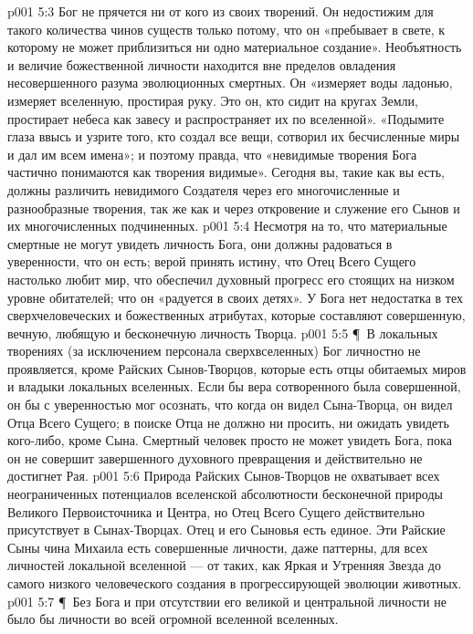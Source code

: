 \vs p001 5:3 Бог не прячется ни от кого из своих творений. Он недостижим для такого количества чинов существ только потому, что он «пребывает в свете, к которому не может приблизиться ни одно материальное создание». Необъятность и величие божественной личности находится вне пределов овладения несовершенного разума эволюционных смертных. Он «измеряет воды ладонью, измеряет вселенную, простирая руку. Это он, кто сидит на кругах Земли, простирает небеса как завесу и распространяет их по вселенной». «Подымите глаза ввысь и узрите того, кто создал все вещи, сотворил их бесчисленные миры и дал им всем имена»; и поэтому правда, что «невидимые творения Бога частично понимаются как творения видимые». Сегодня вы, такие как вы есть, должны различить невидимого Создателя через его многочисленные и разнообразные творения, так же как и через откровение и служение его Сынов и их многочисленных подчиненных.
\vs p001 5:4 Несмотря на то, что материальные смертные не могут увидеть личность Бога, они должны радоваться в уверенности, что он есть; верой принять истину, что Отец Всего Сущего настолько любит мир, что обеспечил духовный прогресс его стоящих на низком уровне обитателей; что он «радуется в своих детях». У Бога нет недостатка в тех сверхчеловеческих и божественных атрибутах, которые составляют совершенную, вечную, любящую и бесконечную личность Творца.
\vs p001 5:5 \P\ В локальных творениях (за исключением персонала сверхвселенных) Бог личностно не проявляется, кроме Райских Сынов\hyp{}Творцов, которые есть отцы обитаемых миров и владыки локальных вселенных. Если бы вера сотворенного была совершенной, он бы с уверенностью мог осознать, что когда он видел Сына\hyp{}Творца, он видел Отца Всего Сущего; в поиске Отца не должно ни просить, ни ожидать увидеть кого\hyp{}либо, кроме Сына. Смертный человек просто не может увидеть Бога, пока он не совершит завершенного духовного превращения и действительно не достигнет Рая.
\vs p001 5:6 Природа Райских Сынов\hyp{}Творцов не охватывает всех неограниченных потенциалов вселенской абсолютности бесконечной природы Великого Первоисточника и Центра, но Отец Всего Сущего действительно  присутствует в Сынах\hyp{}Творцах. Отец и его Сыновья есть единое. Эти Райские Сыны чина Михаила есть совершенные личности, даже паттерны, для всех личностей локальной вселенной --- от таких, как Яркая и Утренняя Звезда до самого низкого человеческого создания в прогрессирующей эволюции животных.
\vs p001 5:7 \P\ Без Бога и при отсутствии его великой и центральной личности не было бы личности во всей огромной вселенной вселенных. 
